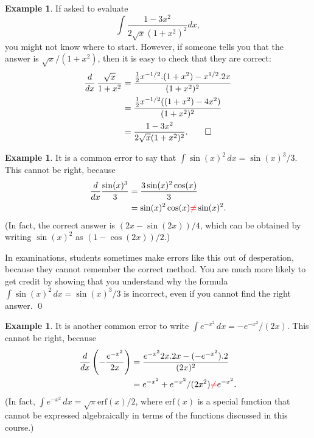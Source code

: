 \documentclass[a4paper]{book}
\newcommand{\RED}[1]{{\color{red}#1}}
\renewcommand{\:}{\colon}
\theoremstyle{definition}
\newtheorem{example}[theorem]{Example}
\begin{document}
\begin{example}
 If asked to evaluate
 \[ \int \frac{1 - 3x^2}{2\sqrt{x}(1 + x^2)^2} dx, \]
 you might not know where to start.  However, if someone tells you
 that the answer is $\sqrt{x}/(1+x^2)$, then it is easy to check
 that they are correct:
 \begin{align*}
  \frac{d}{dx}\,\frac{\sqrt{x}}{1+x^2} 
   &= \frac{\frac{1}{2}x^{-1/2}.(1+x^2) - x^{1/2}.2x}{(1+x^2)^2} \\
   &= \frac{\frac{1}{2}x^{-1/2}((1+x^2)-4x^2)}{(1+x^2)^2} \\
   &= \frac{1-3x^2}{2\sqrt{x}(1+x^2)^2}. \qed
 \end{align*}
\end{example}
\begin{example}
 It is a common error to say that $\int\sin(x)^2\,dx=\sin(x)^3/3$.
 This cannot be right, because
 \begin{align*}
  \frac{d}{dx}\frac{\sin(x)^3}{3} &= \frac{3\sin(x)^2\cos(x)}{3} \\
   &= \sin(x)^2\cos(x) \RED{\neq} \sin(x)^2.
 \end{align*}
 (In fact, the correct answer is $(2x-\sin(2x))/4$, which can be
 obtained by writing $\sin(x)^2$ as $(1-\cos(2x))/2$.)

 In examinations, students sometimes make errors like this out of
 desperation, because they cannot remember the correct method.  You
 are much more likely to get credit by showing that you understand why
 the formula $\int\sin(x)^2\,dx=\sin(x)^3/3$ is incorrect, even if you
 cannot find the right answer.
 \qed
\end{example}
\begin{example}
 It is another common error to write
 $\int e^{-x^2}\,dx=-e^{-x^2}/(2x)$.  This cannot be right, because
 \begin{align*}
  \frac{d}{dx}\left(-\frac{e^{-x^2}}{2x}\right) &= 
   \frac{e^{-x^2}2x.2x - (-e^{-x^2}).2}{(2x)^2} \\
   &= e^{-x^2} + e^{-x^2}/(2x^2) \RED{\neq} e^{-x^2}.
 \end{align*}
 (In fact, $\int e^{-x^2}\,dx=\sqrt{\pi}\text{erf}(x)/2$, where
 $\text{erf}(x)$ is a special function that cannot be expressed
 algebraically in terms of the functions discussed in this course.)
\end{example}
\end{document}
